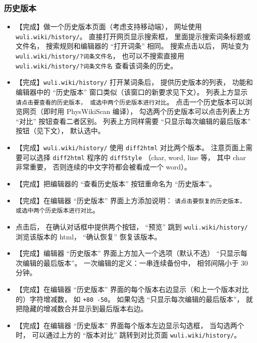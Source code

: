 \subsubsection{历史版本}
\begin{itemize}
\item 【完成】做一个历史版本页面（考虑支持移动端）， 网址使用 \verb|wuli.wiki/history/|。 直接打开网页显示搜索框， 里面提示搜索词条标题或文件名， 搜索规则和编辑器的 “打开词条” 相同。 搜索点击以后， 网址变为 \verb|wuli.wiki/history/?词条文件名|， 也可以不搜索直接用 \verb|wuli.wiki/history/?词条文件名| 查看该词条的历史。

\item 【完成】\verb|wuli.wiki/history/| 打开某词条后， 提供历史版本的列表， 功能和编辑器中的 “历史版本” 窗口类似（该窗口的新要求见下文）。 列表上方显示 \verb|请点击要查看的历史版本， 或选中两个历史版本进行对比|。 点击一个历史版本可以浏览网页（即时用 PhysWikiScan 编译）， 勾选两个历史版本可以点击列表上方 “对比” 按钮查看二者区别。 列表上方同样需要 “只显示每次编辑的最后版本” 按钮（见下文）， 默认选中。

\item 【完成】\verb|wuli.wiki/history/| 使用 \verb|diff2html| 对比两个版本。 注意页面上需要可以选择 \verb|diff2html| 程序的 \verb|diffStyle| （char, word, line 等， 其中 char 非常重要， 否则连续的中文字符都会被看成一个 word）。

\item 【完成】把编辑器的 “查看历史版本” 按钮重命名为 “历史版本”。

\item 【完成】在编辑器 “历史版本” 界面上方添加说明： \verb|请点击要恢复的历史版本， 或选中两个历史版本进行对比|。

\item 点击后， 在确认对话框中提供两个按钮， “预览” 跳到 \verb|wuli.wiki/history/| 浏览该版本的 html， “确认恢复” 恢复该版本。

\item 【完成】编辑器 “历史版本” 界面上方加入一个选项（默认不选） “只显示每次编辑的最后版本”。 一次编辑的定义：一串连续备份中， 相邻间隔小于 30 分钟。

\item 【完成】在编辑器 “历史版本” 界面的每个版本右边显示（和上一个版本对比的）字符增减数， 如 \verb|+80 -50|。 如果勾选 “只显示每次编辑的最后版本”， 就把隐藏的增减数合并显示到最后版本右边。

\item 【完成】在编辑器 “历史版本” 界面每个版本左边显示勾选框， 当勾选两个时， 可以通过上方的 “版本对比” 跳转到对比页面 \verb|wuli.wiki/history/|。
\end{itemize}

